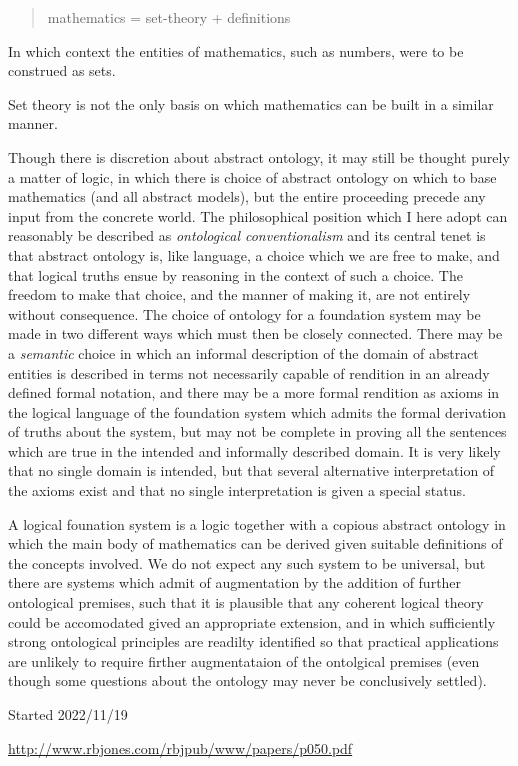 \documentclass[10pt,titlepage]{article}
\begin{document}
\begin{quote}
  mathematics = set-theory + definitions
\end{quote}

In which context the entities of mathematics, such as numbers, were to be construed as sets.

Set theory is not the only basis on which mathematics can be built in a similar manner.

Though there is discretion about abstract ontology, it may still be thought purely a matter of logic, in which there is choice of abstract ontology on which to base mathematics (and all abstract models), but the entire proceeding precede any input from the concrete world.
The philosophical position which I here adopt can reasonably be described as \emph{ontological conventionalism} and its central tenet is that abstract ontology is, like language, a choice which we are free to make, and that logical truths ensue by reasoning in the context of such a choice.
The freedom to make that choice, and the manner of making it, are not entirely without consequence.
The choice of ontology for a foundation system may be made in two different ways which must then be closely connected.
There may be a \emph{semantic} choice in which an informal description of the domain of abstract entities is described in terms not necessarily capable of rendition in an already defined formal notation, and there may be a more formal rendition as axioms in the logical language of the foundation system which admits the formal derivation of truths about the system, but may not be complete in proving all the sentences which are true in the intended and informally described domain.
It is very likely that no single domain is intended, but that several alternative interpretation of the axioms exist and that no single interpretation is given a special status.

A logical founation system is a logic together with a copious abstract ontology in which the main body of mathematics can be derived given suitable definitions of the concepts involved.
We do not expect any such system to be universal, but there are systems which admit of augmentation by the addition of further ontological premises, such that it is plausible that any coherent logical theory could be accomodated gived an appropriate extension, and in which sufficiently strong ontological principles are readilty identified so that practical applications are unlikely to require firther augmentataion of the ontolgical premises (even though some questions about the ontology may never be conclusively settled).



{}



\label{index}
{\twocolumn[]
  {\small\printindex}}


\tiny{
Started 2022/11/19

\href{http://www.rbjones.com/rbjpub/www/papers/p049.pdf}{http://www.rbjones.com/rbjpub/www/papers/p050.pdf}

}%
\end{document}
